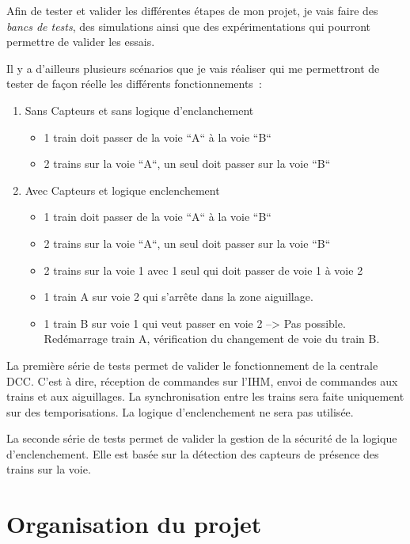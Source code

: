 Afin de tester et valider les diff\'erentes \'etapes de mon projet, je vais
faire des \emph{bancs de tests}, des simulations ainsi que des
exp\'erimentations qui pourront permettre de valider les essais.

Il y a d'ailleurs plusieurs sc\'enarios que je vais r\'ealiser qui
me permettront de tester de façon r\'eelle les différents fonctionnements~:


\begin{enumerate}[A]
  \item Sans Capteurs et sans logique d'enclanchement
  \begin{itemize}
    \item 1 train doit passer de la voie ``A`` à la voie ``B``
    \item 2 trains sur la voie ``A``, un seul doit passer sur la voie
       ``B``
  \end{itemize}

  \item Avec Capteurs et logique enclenchement
  \begin{itemize}
    \item 1 train doit passer de la voie ``A`` à la voie ``B``
    \item 2 trains sur la voie ``A``, un seul doit passer sur la voie ``B``
    \item 2 trains sur la voie 1 avec 1 seul qui doit passer de voie 1 à voie 2
    \item 1 train A sur voie 2 qui s'arrête dans la zone aiguillage.
    \item 1 train B sur voie 1 qui veut passer en voie 2 --> Pas
       possible. Red\'emarrage train A, v\'erification du changement de
       voie du train B.
  \end{itemize}
\end{enumerate}

La première série de tests permet de valider le fonctionnement de la
centrale DCC. C'est à dire, réception de commandes sur l'IHM, envoi de
commandes aux trains et aux aiguillages. La synchronisation entre les
trains sera faite uniquement sur des temporisations. La logique
d'enclenchement ne sera pas utilisée.

La seconde série de tests permet de valider la gestion de la sécurité
de la logique d'enclenchement. Elle est basée sur la détection des
capteurs de présence des trains sur la voie. 


\section{Organisation du projet}
\label{sec:org_proj}

